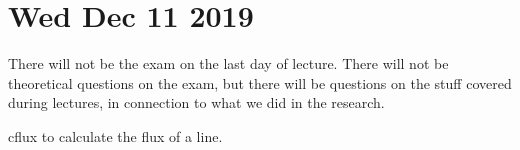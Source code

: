 \documentclass[main.tex]{subfiles}
\begin{document}
\section*{Wed Dec 11 2019}

There will not be the exam on the last day of lecture. 
There will not be theoretical questions on the exam, but there will be questions on the stuff covered during lectures, in connection to what we did in the research. 

cflux to calculate the flux of a line.
\end{document}
